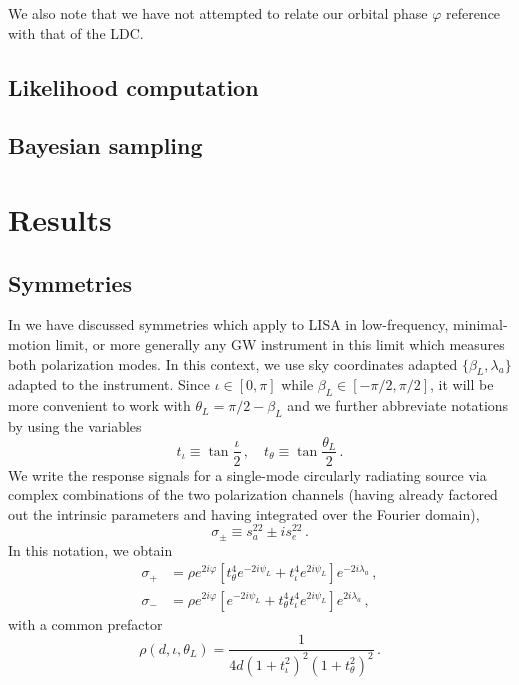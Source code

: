 \documentclass[aps,showpacs,12pt,onecolumn,prd,superscriptaddress,nofootinbib]{revtex4}
\newcommand{\be}{\begin{equation}}
\newcommand{\ee}{\end{equation}}
\newcommand{\bsub}{\begin{subequations}}
\newcommand{\esub}{\end{subequations}}
\newcommand\psiL{{\psi_{L}}}
\begin{document}
We also note that we have not attempted to relate our orbital phase $\varphi$ reference with that of the LDC.


\subsection{Likelihood computation}
\label{sec:likelihood}

\subsection{Bayesian sampling}
\label{sec:MCMC}

\section{Results}



\subsection{Symmetries}

In \cite{MarsatEA2019} we have discussed symmetries which apply to LISA in low-frequency, minimal-motion limit, or more generally any GW instrument in this limit which measures both polarization modes. In this context, we use sky coordinates adapted $\{\beta_{L},\lambda_{a}\}$ adapted to the instrument. Since $\iota \in [0, \pi]$ while $\beta_{L} \in [-\pi/2, \pi/2]$, it will be more convenient to work with $\theta_{L} = \pi/2 - \beta_{L}$ and we further abbreviate notations by using the variables
\be
	t_{\iota} \equiv \tan \frac{\iota}{2} \,, \quad t_{\theta} \equiv \tan \frac{\theta_{L}}{2} \,.
\ee
We write the response signals for a single-mode circularly radiating source via complex combinations of the two polarization channels (having already factored out the intrinsic parameters and having integrated over the Fourier domain),
\be
	\sigma_{\pm} \equiv s_{a}^{22} \pm i s_{e}^{22} \,.
\ee
In this notation, we obtain
\bsub\label{eq:sigmapm}
\begin{align}
  \sigma_{+} &= \rho e^{2i\varphi} \left[ t_{\theta}^{4} e^{-2 i \psiL} + t_{\iota}^{4} e^{2 i \psiL} \right] e^{-2i \lambda_{a}} \,, \\
  \sigma_{-} &= \rho e^{2i\varphi} \left[ e^{-2 i \psiL} + t_{\theta}^{4} t_{\iota}^{4} e^{2 i \psiL} \right] e^{2i \lambda_{a}} \,,
\end{align}
\esub
with a common prefactor 
\be\label{eq:sigmafactorrho}
\rho(d, \iota, \theta_{L}) = \frac{1}{4d\left( 1 + t_{\iota}^{2} \right)^{2} \left(1 + t_{\theta}^{2} \right)^{2}} \,.
\ee
\end{document}
